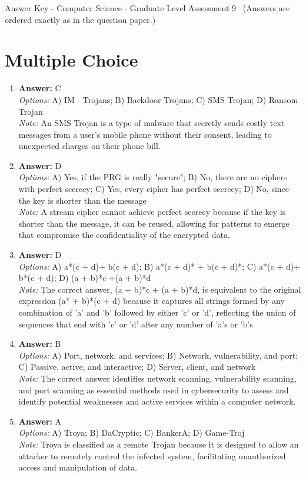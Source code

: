 \documentclass[12pt]{article}
\begin{document}
\begin{center}
Answer Key - Computer Science - Graduate Level Assessment 9 \
\small (Answers are ordered exactly as in the question paper.)
\end{center}

\section*{Multiple Choice}
\begin{enumerate}[label=\arabic*.]
\item \textbf{Answer:} C
\\ \textit{Options:} A) IM - Trojans; B) Backdoor Trojans; C) SMS Trojan; D) Ransom Trojan
\\ \textit{Note:} An SMS Trojan is a type of malware that secretly sends costly text messages from a user's mobile phone without their consent, leading to unexpected charges on their phone bill.
\item \textbf{Answer:} D
\\ \textit{Options:} A) Yes, if the PRG is really "secure"; B) No, there are no ciphers with perfect secrecy; C) Yes, every cipher has perfect secrecy; D) No, since the key is shorter than the message
\\ \textit{Note:} A stream cipher cannot achieve perfect secrecy because if the key is shorter than the message, it can be reused, allowing for patterns to emerge that compromise the confidentiality of the encrypted data.
\item \textbf{Answer:} D
\\ \textit{Options:} A) a*(c + d)+ b(c + d); B) a*(c + d)* + b(c + d)*; C) a*(c + d)+ b*(c + d); D) (a + b)*c +(a + b)*d
\\ \textit{Note:} The correct answer, (a + b)*c + (a + b)*d, is equivalent to the original expression (a* + b)*(c + d) because it captures all strings formed by any combination of 'a' and 'b' followed by either 'c' or 'd', reflecting the union of sequences that end with 'c' or 'd' after any number of 'a's or 'b's.
\item \textbf{Answer:} B
\\ \textit{Options:} A) Port, network, and services; B) Network, vulnerability, and port; C) Passive, active, and interactive; D) Server, client, and network
\\ \textit{Note:} The correct answer identifies network scanning, vulnerability scanning, and port scanning as essential methods used in cybersecurity to assess and identify potential weaknesses and active services within a computer network.
\item \textbf{Answer:} A
\\ \textit{Options:} A) Troya; B) DaCryptic; C) BankerA; D) Game-Troj
\\ \textit{Note:} Troya is classified as a remote Trojan because it is designed to allow an attacker to remotely control the infected system, facilitating unauthorized access and manipulation of data.
\end{enumerate}
\end{document}
